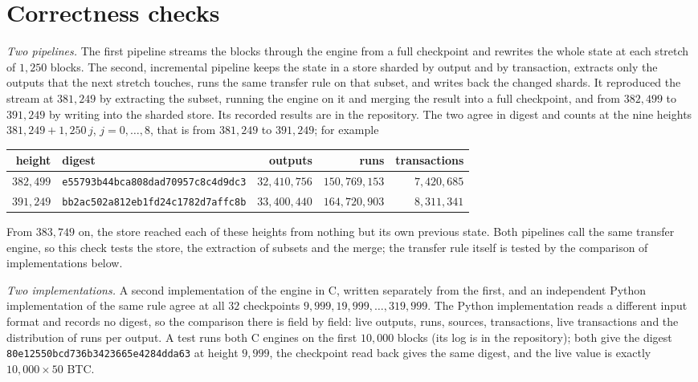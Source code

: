 \documentclass[11pt]{amsart}
\begin{document}
\section{Correctness checks}\label{sec:checks}

\emph{Two pipelines.} The first pipeline streams the blocks through the engine from a full checkpoint and rewrites the whole state at each stretch of $1{,}250$ blocks. The second, incremental pipeline keeps the state in a store sharded by output and by transaction, extracts only the outputs that the next stretch touches, runs the same transfer rule on that subset, and writes back the changed shards. It reproduced the stream at $381{,}249$ by extracting the subset, running the engine on it and merging the result into a full checkpoint, and from $382{,}499$ to $391{,}249$ by writing into the sharded store. Its recorded results are in the repository. The two agree in digest and counts at the nine heights $381{,}249 + 1{,}250\,j$, $j = 0, \dots, 8$, that is from $381{,}249$ to $391{,}249$; for example
\begin{center}\small
\begin{tabular}{rlrrr}
\toprule
height & digest & outputs & runs & transactions \\
\midrule
$382{,}499$ & \texttt{e55793b44bca808dad70957c8c4d9dc3} & $32{,}410{,}756$ & $150{,}769{,}153$ & $7{,}420{,}685$ \\
$391{,}249$ & \texttt{bb2ac502a812eb1fd24c1782d7affc8b} & $33{,}400{,}440$ & $164{,}720{,}903$ & $8{,}311{,}341$ \\
\bottomrule
\end{tabular}
\end{center}
From $383{,}749$ on, the store reached each of these heights from nothing but its own previous state. Both pipelines call the same transfer engine, so this check tests the store, the extraction of subsets and the merge; the transfer rule itself is tested by the comparison of implementations below.

\emph{Two implementations.} A second implementation of the engine in C, written separately from the first, and an independent Python implementation of the same rule agree at all $32$ checkpoints $9{,}999, 19{,}999, \dots, 319{,}999$. The Python implementation reads a different input format and records no digest, so the comparison there is field by field: live outputs, runs, sources, transactions, live transactions and the distribution of runs per output. A test runs both C engines on the first $10{,}000$ blocks (its log is in the repository); both give the digest \texttt{80e12550bcd736b3423665e4284dda63} at height $9{,}999$, the checkpoint read back gives the same digest, and the live value is exactly $10{,}000 \times 50$ BTC.
\end{document}
